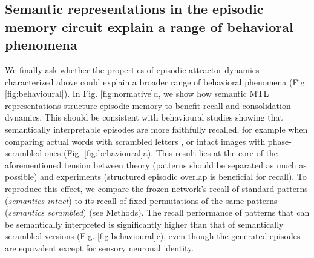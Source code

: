 \documentclass{article}
\begin{document}
\subsection*{Semantic representations in the episodic memory circuit explain a range of behavioral phenomena}
We finally ask whether the properties of episodic attractor dynamics characterized above could explain a broader range of behavioral phenomena (Fig. \ref{fig:behavioural}). 
\newline\newline
In Fig. \ref{fig:normative}d, we show how semantic MTL representations structure episodic memory to benefit recall and consolidation dynamics. This should be consistent with behavioural studies showing that semantically interpretable episodes are more faithfully recalled, for example when comparing actual words with scrambled letters , or intact images with phase-scrambled ones  (Fig. \ref{fig:behavioural}a). This result lies at the core of the aforementioned tension between theory (patterns should be separated as much as possible) and experiments (structured episodic overlap is beneficial for recall). To reproduce this effect, we compare the frozen network's recall of standard patterns (\textit{semantics intact}) to its recall of fixed permutations of the same patterns (\textit{semantics scrambled}) (see Methods). The recall performance of patterns that can be semantically interpreted is significantly higher than that of semantically scrambled versions (Fig. \ref{fig:behavioural}c), even though the generated episodes are equivalent except for sensory neuronal identity.
\newline\newline
\end{document}
